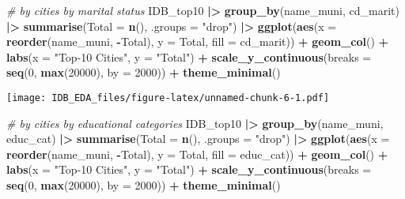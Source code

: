 \documentclass[
]{article}
\newenvironment{Shaded}{\begin{snugshade}}{\end{snugshade}}
\newcommand{\AttributeTok}[1]{\textcolor[rgb]{0.13,0.29,0.53}{#1}}
\newcommand{\CommentTok}[1]{\textcolor[rgb]{0.56,0.35,0.01}{\textit{#1}}}
\newcommand{\DecValTok}[1]{\textcolor[rgb]{0.00,0.00,0.81}{#1}}
\newcommand{\FunctionTok}[1]{\textcolor[rgb]{0.13,0.29,0.53}{\textbf{#1}}}
\newcommand{\NormalTok}[1]{#1}
\newcommand{\SpecialCharTok}[1]{\textcolor[rgb]{0.81,0.36,0.00}{\textbf{#1}}}
\newcommand{\StringTok}[1]{\textcolor[rgb]{0.31,0.60,0.02}{#1}}
\begin{document}
\begin{Shaded}
\begin{Highlighting}[]
\CommentTok{\# by cities by marital status}
\NormalTok{IDB\_top10 }\SpecialCharTok{|\textgreater{}}
  \FunctionTok{group\_by}\NormalTok{(name\_muni, cd\_marit) }\SpecialCharTok{|\textgreater{}}
  \FunctionTok{summarise}\NormalTok{(}\AttributeTok{Total =} \FunctionTok{n}\NormalTok{(), }\AttributeTok{.groups =} \StringTok{"drop"}\NormalTok{) }\SpecialCharTok{|\textgreater{}}
  \FunctionTok{ggplot}\NormalTok{(}\FunctionTok{aes}\NormalTok{(}\AttributeTok{x =} \FunctionTok{reorder}\NormalTok{(name\_muni, }\SpecialCharTok{{-}}\NormalTok{Total), }\AttributeTok{y =}\NormalTok{ Total, }\AttributeTok{fill =}\NormalTok{ cd\_marit)) }\SpecialCharTok{+}
  \FunctionTok{geom\_col}\NormalTok{() }\SpecialCharTok{+}
  \FunctionTok{labs}\NormalTok{(}\AttributeTok{x =} \StringTok{"Top{-}10 Cities"}\NormalTok{, }\AttributeTok{y =} \StringTok{"Total"}\NormalTok{) }\SpecialCharTok{+}
  \FunctionTok{scale\_y\_continuous}\NormalTok{(}\AttributeTok{breaks =} \FunctionTok{seq}\NormalTok{(}\DecValTok{0}\NormalTok{, }\FunctionTok{max}\NormalTok{(}\DecValTok{20000}\NormalTok{), }\AttributeTok{by =} \DecValTok{2000}\NormalTok{)) }\SpecialCharTok{+}
  \FunctionTok{theme\_minimal}\NormalTok{()}
\end{Highlighting}
\end{Shaded}

\texttt{[image: IDB\_EDA\_files/figure-latex/unnamed-chunk-6-1.pdf]}

\begin{Shaded}
\begin{Highlighting}[]
\CommentTok{\# by cities by educational categories}
\NormalTok{IDB\_top10 }\SpecialCharTok{|\textgreater{}}
  \FunctionTok{group\_by}\NormalTok{(name\_muni, educ\_cat) }\SpecialCharTok{|\textgreater{}}
  \FunctionTok{summarise}\NormalTok{(}\AttributeTok{Total =} \FunctionTok{n}\NormalTok{(), }\AttributeTok{.groups =} \StringTok{"drop"}\NormalTok{) }\SpecialCharTok{|\textgreater{}}
  \FunctionTok{ggplot}\NormalTok{(}\FunctionTok{aes}\NormalTok{(}\AttributeTok{x =} \FunctionTok{reorder}\NormalTok{(name\_muni, }\SpecialCharTok{{-}}\NormalTok{Total), }\AttributeTok{y =}\NormalTok{ Total, }\AttributeTok{fill =}\NormalTok{ educ\_cat)) }\SpecialCharTok{+}
  \FunctionTok{geom\_col}\NormalTok{() }\SpecialCharTok{+}
  \FunctionTok{labs}\NormalTok{(}\AttributeTok{x =} \StringTok{"Top{-}10 Cities"}\NormalTok{, }\AttributeTok{y =} \StringTok{"Total"}\NormalTok{) }\SpecialCharTok{+}
  \FunctionTok{scale\_y\_continuous}\NormalTok{(}\AttributeTok{breaks =} \FunctionTok{seq}\NormalTok{(}\DecValTok{0}\NormalTok{, }\FunctionTok{max}\NormalTok{(}\DecValTok{20000}\NormalTok{), }\AttributeTok{by =} \DecValTok{2000}\NormalTok{)) }\SpecialCharTok{+}
  \FunctionTok{theme\_minimal}\NormalTok{()}
\end{Highlighting}
\end{Shaded}
\end{document}
